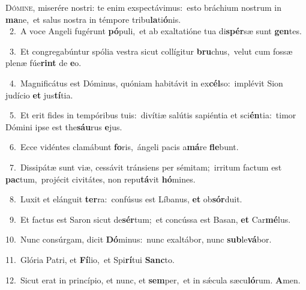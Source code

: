 \lettrine{\initial\textcolor{\initialcolor}{D}}{ómine,} miserére nostri: te enim exspectávimus:~\dagger esto bráchium nostrum in \textbf{ma}\-ne,~\star et salus nostra in témpore tribu\-\textbf{la}\-ti\-\textbf{ó}\-nis.\\
{\numbfont\textcolor{\numbcolor}{~2.}}~A voce Angeli fugérunt \textbf{pó}\-puli,~\star et ab exaltatióne tua di\-\textbf{spér}\-sæ sunt \textbf{gen}\-tes.\par
{\numbfont\textcolor{\numbcolor}{~3.}}~Et congregabúntur spólia vestra sicut collígitur \textbf{bru}\-chus,~\star velut cum fossæ plenæ fúe\textbf{rint} de \textbf{e}\-o.\par
{\numbfont\textcolor{\numbcolor}{~4.}}~Magnificátus est Dóminus, quóniam habitávit in ex\-\textbf{cél}\-so:~\star implévit Sion judício \textbf{et} jus\-\textbf{tí}\-tia.\par
{\numbfont\textcolor{\numbcolor}{~5.}}~Et erit fides in tempóribus tuis:~\dagger divítiæ salútis sapiéntia et sci\-\textbf{én}\-tia:~\star timor Dómini ipse est the\-\textbf{sáu}\-rus \textbf{e}\-jus.\par
{\numbfont\textcolor{\numbcolor}{~6.}}~Ecce vidéntes clamábunt \textbf{fo}\-ris,~\star ángeli pacis a\-\textbf{má}\-re \textbf{fle}\-bunt.\par
{\numbfont\textcolor{\numbcolor}{~7.}}~Dissipátæ sunt viæ, cessávit tránsiens per sémitam;~\dagger irritum factum est \textbf{pac}\-tum,~\star projécit civitátes, non repu\-\textbf{tá}\-vit \textbf{hó}\-mines.\par
{\numbfont\textcolor{\numbcolor}{~8.}}~Luxit et elánguit \textbf{ter}\-ra:~\star confúsus est Líbanus, \textbf{et} ob\-\textbf{sór}\-duit.\par
{\numbfont\textcolor{\numbcolor}{~9.}}~Et factus est Saron sicut de\-\textbf{sér}\-tum;~\star et concússa est Basan, \textbf{et} Car\-\textbf{mé}\-lus.\par
{\numbfont\textcolor{\numbcolor}{10.}}~Nunc consúrgam, dicit \textbf{Dó}\-minus:~\star nunc exaltábor, nunc \textbf{sub}\-le\-\textbf{vá}\-bor.\par
{\numbfont\textcolor{\numbcolor}{11.}}~Glória Patri, et \textbf{Fí}\-lio,~\star et Spi\-\textbf{rí}\-tui \textbf{Sanc}\-to.\par
{\numbfont\textcolor{\numbcolor}{12.}}~Sicut erat in princípio, et nunc, et \textbf{sem}\-per,~\star et in sǽcula sæcu\-\textbf{ló}\-rum. \textbf{A}\-men.\par

